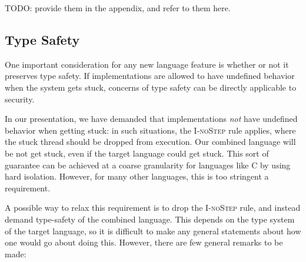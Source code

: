 TODO: provide them in the appendix, and refer to them here.


\subsection{Type Safety}
\label{sec:extensions:types}

One important consideration for any new language feature is whether
or not it preserves type safety.  If implementations are allowed to
have undefined behavior when the system gets stuck, concerns of type
safety can be directly applicable to security.

In our presentation, we have demanded that implementations \emph{not}
have undefined behavior when getting stuck: in such situations, the
\textsc{I-noStep} rule applies, where the stuck thread should be dropped
from execution.  Our combined language will be not get stuck, even if
the target language could get stuck.  This sort of guarantee can be
achieved at a coarse granularity for languages like C by using hard
isolation.  However, for many other languages, this is too stringent a
requirement.

A possible way to relax this requirement is to drop the \textsc{I-noStep}
rule, and instead demand type-safety of the combined language.  This
depends on the type system of the target language, so it is difficult to
make any general statements about how one would go about doing this.  However,
there are few general remarks to be made:

